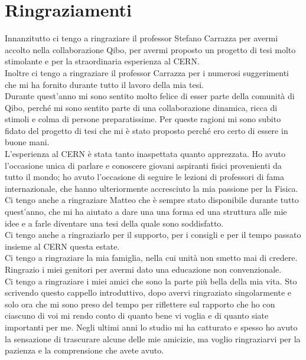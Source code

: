 \section*{Ringraziamenti}

Innanzitutto ci tengo a ringraziare il professor Stefano Carrazza per avermi accolto nella collaborazione Qibo, 
per avermi proposto un progetto di tesi molto stimolante e per la straordinaria esperienza al CERN.\\
Inoltre ci tengo a ringraziare il professor Carrazza per i numerosi suggerimenti che mi ha fornito durante tutto 
il lavoro della mia tesi.\\
Durante quest’anno mi sono sentito molto felice di esser parte della comunità di Qibo, perché mi sono sentito 
parte di una collaborazione dinamica, ricca di stimoli e colma di persone preparatissime.
Per queste ragioni mi sono subito fidato del progetto di tesi che mi è stato proposto perché ero certo di 
essere in buone mani.\\
L’esperienza al CERN è stata tanto inaspettata quanto apprezzata. Ho avuto l’occasione unica di parlare 
e conoscere giovani aspiranti fisici provenienti da tutto il mondo; ho avuto l’occasione di seguire le 
lezioni di professori di fama internazionale, che hanno ulteriormente accresciuto la mia passione per la Fisica.\\
Ci tengo anche a ringraziare Matteo che è sempre stato disponibile durante tutto quest’anno, che mi ha 
aiutato a dare una una forma ed una struttura alle mie idee e a farle diventare una tesi della quale sono 
soddisfatto.\\
Ci tengo anche a ringraziarlo per il supporto, per i consigli e per il tempo passato insieme al CERN questa estate.\\

Ci tengo a ringraziare la mia famiglia, nella cui unità non smetto mai di credere.
Ringrazio i miei genitori per avermi dato una educazione non convenzionale.\\

Ci tengo a ringraziare i miei amici che sono la parte più bella della mia vita. Sto scrivendo questo cappello 
introduttivo, dopo avervi ringraziato singolarmente e solo ora che mi sono preso del tempo per riflettere 
sul rapporto che ho con ciascuno di voi mi rendo conto di quanto bene vi voglia e di quanto siate importanti per me. 
Negli ultimi anni lo studio mi ha catturato e spesso ho avuto la sensazione di trascurare alcune delle mie amicizie, 
ma voglio ringraziarvi per la pazienza e la comprensione che avete avuto.\\

